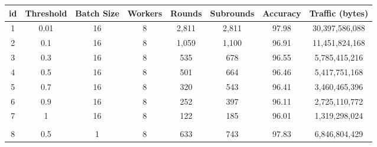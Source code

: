\newpage

\begin{table}[H]
    \begin{tabular}{|c|c|c|c|c|c|c|c|}
        \hline
        \textbf{id}            & \textbf{Threshold}    & \textbf{Batch Size}   & \textbf{Workers}      & \textbf{Rounds}       & \textbf{Subrounds}    & \textbf{Accuracy}     & \textbf{Traffic (bytes)} \\
        \hline
        1                      & 0.01                  & 16                    & 8                     & 2,811                 & 2,811                 & 97.98                 & 30,397,586,088           \\
        2                      & 0.1                   & 16                    & 8                     & 1,059                 & 1,100                 & 96.91                 & 11,451,824,168           \\
        3                      & 0.3                   & 16                    & 8                     & 535                   & 678                   & 96.55                 & 5,785,415,216            \\
        4                      & 0.5                   & 16                    & 8                     & 501                   & 664                   & 96.46                 & 5,417,751,168            \\
        5                      & 0.7                   & 16                    & 8                     & 320                   & 543                   & 96.41                 & 3,460,465,396            \\
        6                      & 0.9                   & 16                    & 8                     & 252                   & 397                   & 96.11                 & 2,725,110,772            \\
        7                      & 1                     & 16                    & 8                     & 122                   & 185                   & 96.01                 & 1,319,298,024            \\
        \hline
        \multicolumn{1}{|l|}{} & \multicolumn{1}{l|}{} & \multicolumn{1}{l|}{} & \multicolumn{1}{l|}{} & \multicolumn{1}{l|}{} & \multicolumn{1}{l|}{} & \multicolumn{1}{l|}{} & \multicolumn{1}{l|}{}    \\
        \hline
        8                      & 0.5                   & 1                     & 8                     & 633                   & 743                   & 97.83                 & 6,846,804,429            \\

\end{tabular}
\end{table}
